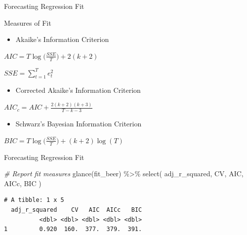 \documentclass[
  ignorenonframetext,
]{beamer}
\newenvironment{Shaded}{\begin{snugshade}}{\end{snugshade}}
\newcommand{\CommentTok}[1]{\textcolor[rgb]{0.56,0.35,0.01}{\textit{#1}}}
\newcommand{\FunctionTok}[1]{\textcolor[rgb]{0.00,0.00,0.00}{#1}}
\newcommand{\NormalTok}[1]{#1}
\newcommand{\SpecialCharTok}[1]{\textcolor[rgb]{0.00,0.00,0.00}{#1}}
\providecommand{\tightlist}{%
  \setlength{\itemsep}{0pt}\setlength{\parskip}{0pt}}
\begin{document}
\begin{frame}{Forecasting \textbar{} \small Regression Fit}
\protect\hypertarget{forecasting-regression-fit-1}{}
\begin{block}{Measures of Fit}
\protect\hypertarget{measures-of-fit-1}{}
\begin{itemize}
\tightlist
\item
  Akaike's Information Criterion \newline
\end{itemize}

\center \(AIC = T \log \bigg(\frac{SSE}{T}\bigg) + 2(k+2)\) \newline

\center \(SSE = \sum_{t=1}^T e^2_t\) \newline

\begin{itemize}
\tightlist
\item
  Corrected Akaike's Information Criterion \newline
\end{itemize}

\center \(AIC_c = AIC + \frac{2(k+2)(k+3)}{T - k - 3}\) \newline

\begin{itemize}
\tightlist
\item
  Schwarz's Bayesian Information Criterion \newline
\end{itemize}

\center \(BIC = T \log \bigg(\frac{SSE}{T}\bigg) + (k+2) \log(T)\)
\end{block}
\end{frame}

\begin{frame}[fragile]{Forecasting \textbar{} \small Regression Fit}
\protect\hypertarget{forecasting-regression-fit-2}{}
\footnotesize

\normalfont

\footnotesize

\begin{Shaded}
\begin{Highlighting}[]
\CommentTok{\# Report fit measures}
\FunctionTok{glance}\NormalTok{(fit\_beer) }\SpecialCharTok{\%\textgreater{}\%}
  \FunctionTok{select}\NormalTok{(}
\NormalTok{    adj\_r\_squared, CV, AIC, AICc, BIC}
\NormalTok{  )}
\end{Highlighting}
\end{Shaded}

\begin{verbatim}
# A tibble: 1 x 5
  adj_r_squared    CV   AIC  AICc   BIC
          <dbl> <dbl> <dbl> <dbl> <dbl>
1         0.920  160.  377.  379.  391.
\end{verbatim}

\normalfont
\end{frame}
\end{document}
